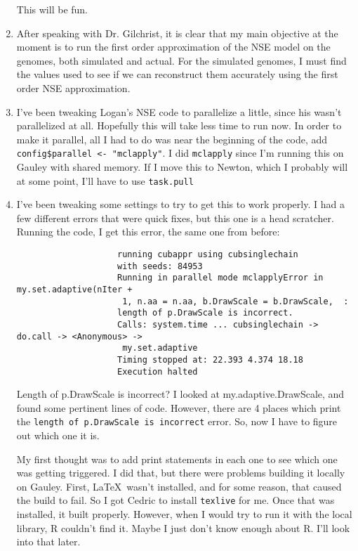 \documentclass[12 pt]{article}
\begin{document}
\begin{enumerate}
				This will be fun.
				
				\item After speaking with Dr. Gilchrist, it is clear that my main objective at the moment is to run the first order approximation of the NSE model on the genomes, both simulated and actual. For the simulated genomes, I must find the values used to see if we can reconstruct them accurately using the first order NSE approximation.
				
				\item I've been tweaking Logan's NSE code to parallelize a little, since his wasn't parallelized at all. Hopefully this will take less time to run now. In order to make it parallel, all I had to do was near the beginning of the code, add \texttt{config\$parallel <- "mclapply"}. I did \texttt{mclapply} since I'm running this on Gauley with shared memory. If I move this to Newton, which I probably will at some point, I'll have to use \texttt{task.pull}
				
				\item I've been tweaking some settings to try to get this to work properly. I had a few different errors that were quick fixes, but this one is a head scratcher. Running the code, I get this error, the same one from before:
				\begin{verbatim}
					running cubappr using cubsinglechain 
					with seeds: 84953
					Running in parallel mode mclapplyError in my.set.adaptive(nIter +
					 1, n.aa = n.aa, b.DrawScale = b.DrawScale,  : 
					length of p.DrawScale is incorrect.
					Calls: system.time ... cubsinglechain -> do.call -> <Anonymous> ->
					 my.set.adaptive
					Timing stopped at: 22.393 4.374 18.18 
					Execution halted
				\end{verbatim}
				
				Length of p.DrawScale is incorrect? I looked at my.adaptive.DrawScale, and found some pertinent lines of code. However, there are 4 places which print the \texttt{length of p.DrawScale is incorrect} error. So, now I have to figure out which one it is.
				
				My first thought was to add print statements in each one to see which one was getting triggered. I did that, but there were problems building it locally on Gauley. First, \LaTeX\ wasn't installed, and for some reason, that caused the build to fail. So I got Cedric to install \texttt{texlive} for me. Once that was installed, it built properly. However, when I would try to run it with the local library, R couldn't find it. Maybe I just don't know enough about R. I'll look into that later. 
				

\end{enumerate}
\end{document}
